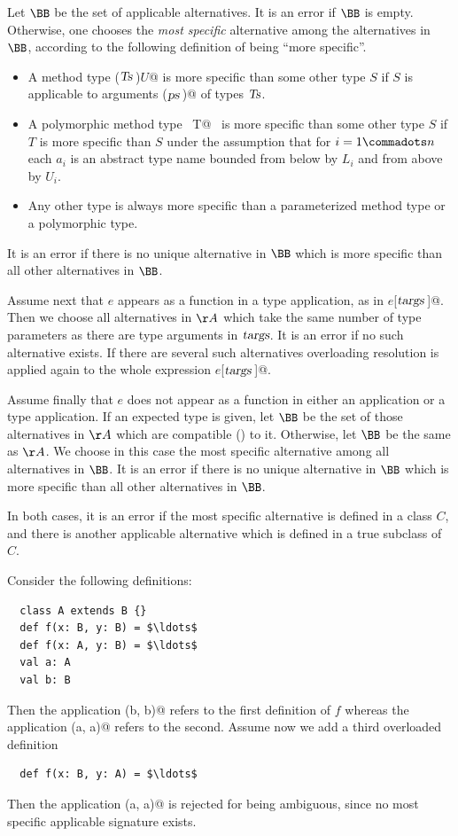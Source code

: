 Let $\BB$ be the set of applicable alternatives. It is an error if
$\BB$ is empty. Otherwise, one chooses the {\em most specific}
alternative among the alternatives in $\BB$, according to the
following definition of being ``more specific''.
\begin{itemize} 
\item
A method type \lstinline@($\mbox{\sl Ts}\,$)$U$@ is more specific than some other
type $S$ if $S$ is applicable to arguments \lstinline@($\mbox{\sl ps}\,$)@ of
types $\mbox{\sl Ts}$.
\item
A polymorphic method type
~\lstinline@[$a_1$ >: $L_1$ <: $U_1 \commadots a_n$ >: $L_n$ <: $U_n$]T@~ is
more specific than some other type $S$ if $T$ is more
specific than $S$ under the assumption that for
$i = 1 \commadots n$ each $a_i$ is an abstract type name
bounded from below by $L_i$ and from above by $U_i$.
\item
Any other type is always more specific than a parameterized method
type or a polymorphic type.
\end{itemize}
It is an error if there is no unique alternative in $\BB$ which is
more specific than all other alternatives in $\BB$.

Assume next that $e$ appears as a function in a type application, as
in \lstinline@$e$[$\mbox{\sl targs}\,$]@. Then we choose all alternatives in
$\AA$ which take the same number of type parameters as there are type
arguments in $\mbox{\sl targs}$. It is an error if no such alternative exists.
If there are several such alternatives overloading resolution is
applied again to the whole expression \lstinline@$e$[$\mbox{\sl targs}\,$]@.  

Assume finally that $e$ does not appear as a function in either
an application or a type application. If an expected type is given,
let $\BB$ be the set of those alternatives in $\AA$ which are
compatible () to it. Otherwise, let $\BB$ be the same as $\AA$.
We choose in this case the most specific alternative among all
alternatives in $\BB$. It is an error if there is no unique
alternative in $\BB$ which is more specific than all other
alternatives in $\BB$.

In both cases, it is an error if the most specific alternative is
defined in a class $C$, and there is another applicable alternative
which is defined in a true subclass of $C$.

\example Consider the following definitions:

\begin{lstlisting}
  class A extends B {}
  def f(x: B, y: B) = $\ldots$
  def f(x: A, y: B) = $\ldots$
  val a: A 
  val b: B
\end{lstlisting}
Then the application \lstinline@f(b, b)@ refers to the first
definition of $f$ whereas the application \lstinline@f(a, a)@
refers to the second.  Assume now we add a third overloaded definition
\begin{lstlisting}
  def f(x: B, y: A) = $\ldots$
\end{lstlisting}
Then the application \lstinline@f(a, a)@ is rejected for being ambiguous, since
no most specific applicable signature exists.

